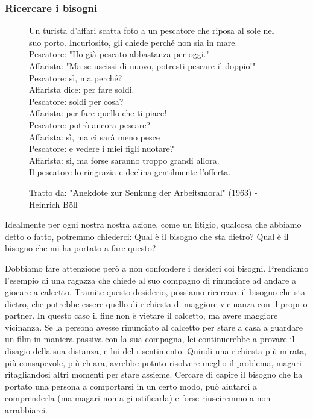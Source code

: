 \documentclass[12pt]{book} %
\begin{document}
\subsubsection{Ricercare i bisogni}
\begin{figure}
    \vspace{-\baselineskip} 
    \begin{tcolorbox}[colback=white, colframe=black, sharp corners, boxrule=1pt, width=\linewidth, left=10pt, right=10pt]
        Un turista d'affari scatta foto a un pescatore che riposa al sole nel suo porto. Incuriosito, gli chiede perché non sia in mare.\\
        Pescatore: "Ho già pescato abbastanza per oggi."\\
        Affarista: "Ma se uscissi di nuovo, potresti pescare il doppio!"\\
        Pescatore: sì, ma perché? \\
        Affarista dice: per fare soldi. \\
        Pescatore: soldi per cosa? \\
        Affarista: per fare quello che ti piace! \\
        Pescatore: potrò ancora pescare?\\
        Affarista: sì, ma ci sarà meno pesce\\
        Pescatore: e vedere i miei figli nuotare?\\
        Affarista: si, ma forse saranno troppo grandi allora.\\
        Il pescatore lo ringrazia e declina gentilmente l'offerta.
        
        \vspace{0.5em}
        \footnotesize{Tratto da: "Anekdote zur Senkung der Arbeitsmoral" (1963) - Heinrich Böll}
    \end{tcolorbox}
    \vspace{-20pt} 
\end{figure}
Idealmente per ogni nostra nostra azione, come un litigio, qualcosa che abbiamo detto o fatto, potremmo chiederci: Qual è il bisogno che sta dietro? Qual è il bisogno che mi ha portato a fare questo?

Dobbiamo fare attenzione però a non confondere i desideri coi bisogni. Prendiamo l'esempio di una ragazza che chiede al suo compagno di rinunciare ad andare a giocare a calcetto. Tramite questo desiderio, possiamo ricercare il bisogno che sta dietro, che potrebbe essere quello di richiesta di maggiore vicinanza con il proprio partner. In questo caso il fine non è vietare il calcetto, ma avere maggiore vicinanza. Se la persona avesse rinunciato al calcetto per stare a casa a guardare un film in maniera passiva con la sua compagna, lei continuerebbe a provare il disagio della sua distanza, e lui del risentimento. Quindi una richiesta più mirata, più consapevole, più chiara, avrebbe potuto risolvere meglio il problema, magari ritagliandosi altri momenti per stare assieme. Cercare di capire il bisogno che ha portato una persona a comportarsi in un certo modo, può aiutarci a comprenderla (ma magari non a giustificarla) e forse riusciremmo a non arrabbiarci.
\end{document}
